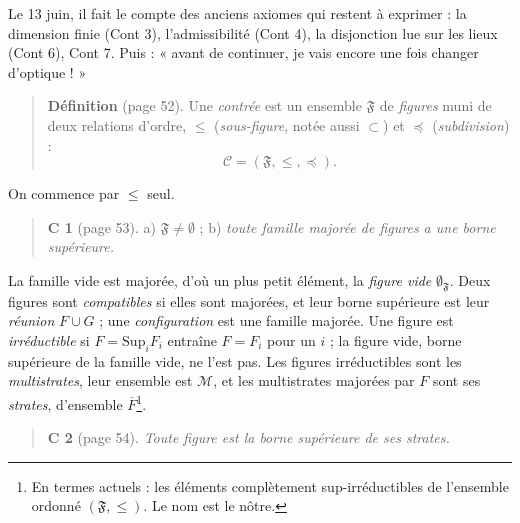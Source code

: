\documentclass[11pt,a4paper]{article}
\begin{document}
Le 13 juin, il fait le compte des anciens axiomes qui restent à exprimer : la
dimension finie (Cont 3), l'admissibilité (Cont 4), la disjonction lue sur les
lieux (Cont 6), Cont 7. Puis : « avant de continuer, je vais encore une fois
changer d'optique ! »

\begin{quote}
\textbf{Définition} (page 52). Une \emph{contrée} est un ensemble
$\mathfrak{F}$ de \emph{figures} muni de deux relations d'ordre, $\leq$
(\emph{sous-figure}, notée aussi $\subset$) et $\preccurlyeq$
(\emph{subdivision}) :
\[
\mathcal{C} = (\mathfrak{F}, \leq, \preccurlyeq).
\]
\end{quote}

On commence par $\leq$ seul.

\begin{quote}
\textbf{C 1} (page 53). a) $\mathfrak{F} \neq \emptyset$ ; b) \emph{toute
famille majorée de figures a une borne supérieure.}
\end{quote}

La famille vide est majorée, d'où un plus petit élément, la \emph{figure vide}
$\emptyset_{\mathfrak{F}}$. Deux figures sont \emph{compatibles} si elles sont
majorées, et leur borne supérieure est leur \emph{réunion} $F \cup G$ ; une
\emph{configuration} est une famille majorée. Une figure est
\emph{irréductible} si $F = \mathrm{Sup}_{i} F_{i}$ entraîne $F = F_{i}$ pour un
$i$ ; la figure vide, borne supérieure de la famille vide, ne l'est pas. Les
figures irréductibles sont les \emph{multistrates}, leur ensemble est
$\mathcal{M}$, et les multistrates majorées par $F$ sont ses \emph{strates},
d'ensemble $\overline{F}$\footnote{En termes actuels : les éléments
complètement sup-irréductibles de l'ensemble ordonné $(\mathfrak{F}, \leq)$.
Le nom est le nôtre.}.

\begin{quote}
\textbf{C 2} (page 54). \emph{Toute figure est la borne supérieure de ses
strates.}
\end{quote}
\end{document}
